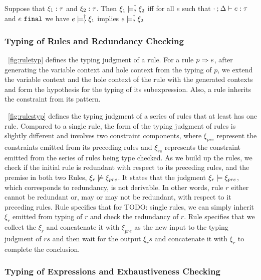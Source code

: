 \documentclass[runningheads,envcountsame,a4paper]{llncs}
\newcommand{\todo}[1]{{\color{red} TODO: #1}}
\begin{document}
\begin{definition}
  \label{defn:nn-entailment}
  Suppose that $\xi_1 : \tau$ and $\xi_2 : \tau$. Then $\xi_1 \models_{?}^{\dag} \xi_2$ iff for all $e$ such that $\cdot \mathbin{;} \Delta \vdash e : \tau$ and $e ~\mathtt{final}$ we have $e \models_{?}^{\dag} \xi_1$ implies $e \models_{?}^{\dag} \xi_2$ 
\end{definition}

\subsubsection{Typing of Rules and Redundancy Checking}

 

\figurename~\ref{fig:ruletyp} defines the typing judgment of a rule. For a rule
$p \Rightarrow e$, after generating the variable context and hole context from the
typing of $p$, we extend the variable context and the hole context of the rule
with the generated contexts and form the hypothesis for the typing of its
subexpression. Also, a rule inherits the constraint from its pattern.



\figurename~\ref{fig:rulestyp} defines the typing judgment of a series of rules
that at least has one rule. Compared to a single rule, the form of the typing
judgment of rules is slightly different and involves two constraint components,
where $\xi_{pre}$ represent the constraints emitted from its preceding rules and
$\xi_{rs}$ represents the constraint emitted from the series of rules being type
checked. As we build up the rules, we check if the initial rule is redundant
with respect to its preceding rules, and the premise in both two Rules,
$\xi_r \not\models \xi_{pre}$. It states that the judgment
$\xi_r \models \xi_{pre}$, which corresponds to redundancy, is not
derivable. In other words, rule $r$ either cannot be redundant or, may or may
not be redundant, with respect to it preceding rules. Rule \TOneRules specifies
that for \todo{single rules}, we can simply inherit $\xi_r$ emitted from typing
of $r$ and check the redundancy of $r$. Rule \TRules specifies that we collect
the $\xi_r$ and concatenate it with $\xi_{pre}$ as the new input to the typing
judgment of $rs$ and then wait for the output $\xi_rs$ and concatenate it with
$\xi_r$ to complete the conclusion.

\subsubsection{Typing of Expressions and Exhaustiveness Checking}
\end{document}
